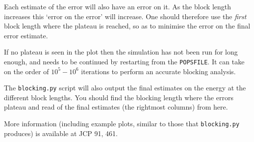 \documentclass[a4paper,notitlepage,dvipsnames]{scrreprt}
\let\code\lstinline
\begin{document}
    Each estimate of the error will also have an error on it. As the block
    length increases this `error on the error' will increase. One should
    therefore use the \emph{first} block length where the plateau is reached,
    so as to minimise the error on the final error estimate.

    If no plateau is seen in the plot then the simulation has not been run for
	long enough, and needs to be continued by restarting from the \code{POPSFILE}.
    It can take on the order of $10^5-10^6$ iterations to perform an accurate
    blocking analysis.

	The \code{blocking.py} script will also output the final estimates on the energy
    at the different block lengths. You should find the blocking length where
    the errors plateau and read of the final estimates (the rightmost columns)
    from here.

	More information (including example plots, similar to those that
	\code{blocking.py} produces) is available at JCP 91, 461.
\end{document}
